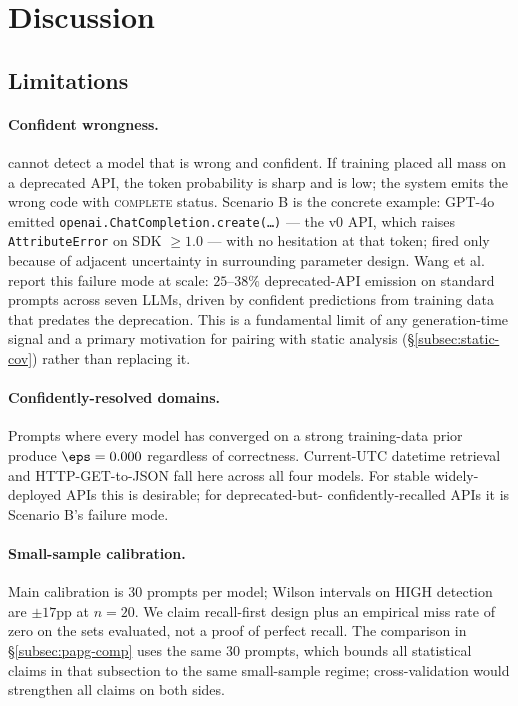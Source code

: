 \section{Discussion}
\label{sec:discussion}

\subsection{Limitations}
\label{subsec:limitations}

\paragraph{Confident wrongness.} \eps cannot detect a model that is
wrong and confident. If training placed all mass on a deprecated API,
the token probability is sharp and \eps is low; the system emits the
wrong code with \textsc{complete} status. Scenario B is the concrete
example: GPT-4o emitted \texttt{openai.ChatCompletion.create(\ldots)}
--- the v0 API, which raises \texttt{AttributeError} on SDK $\ge 1.0$
--- with no hesitation at that token; \eps fired only because of
adjacent uncertainty in surrounding parameter design. Wang et al.~%
\cite{wang2025deprecated} report this failure mode at scale: $25$--$38\%$
deprecated-API emission on standard prompts across seven LLMs, driven
by confident predictions from training data that predates the
deprecation. This is a fundamental limit of any generation-time signal
and a primary motivation for pairing \eps with static analysis
(\S\ref{subsec:static-cov}) rather than replacing it.

\paragraph{Confidently-resolved domains.} Prompts where every model
has converged on a strong training-data prior produce $\eps = 0.000$
regardless of correctness. Current-UTC datetime retrieval and
HTTP-GET-to-JSON fall here across all four models. For stable
widely-deployed APIs this is desirable; for deprecated-but-%
confidently-recalled APIs it is Scenario B's failure mode.

\paragraph{Small-sample calibration.} Main calibration is 30 prompts
per model; Wilson intervals on HIGH detection are $\pm 17$pp at
$n=20$. We claim recall-first design plus an empirical miss rate of
zero on the sets evaluated, not a proof of perfect recall. The \papg
comparison in \S\ref{subsec:papg-comp} uses the same 30 prompts,
which bounds all statistical claims in that subsection to the same
small-sample regime; cross-validation would strengthen all claims on
both sides.

